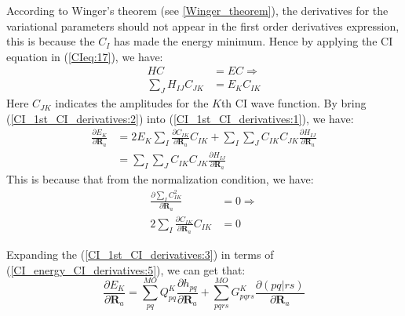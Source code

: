 According to Winger's theorem (see \ref{Winger_theorem}), the derivatives for
the variational parameters should not appear in the first order derivatives
expression, this is because the $C_{I}$ has made the energy minimum. Hence by
applying the CI equation in (\ref{CIeq:17}), we have:
\begin{align}
  \label{CI_1st_CI_derivatives:2}
HC &= EC \Longrightarrow \nonumber \\
\sum_{J}H_{IJ}C_{JK} &= E_{K}C_{IK} 
\end{align}
Here $C_{JK}$ indicates the amplitudes for the $K$th CI wave function. By bring
(\ref{CI_1st_CI_derivatives:2}) into (\ref{CI_1st_CI_derivatives:1}), we have:
\begin{align}
 \label{CI_1st_CI_derivatives:3}
\frac{\partial E_{K}}{ \partial \bm{R}_{a}} &= 2E_{K}\sum_{I}\frac{\partial
C_{IK}}{\partial \bm{R}_{a}}C_{IK} +
\sum_{I}\sum_{J}C_{IK}C_{JK}\frac{\partial H_{IJ} }{\partial \bm{R}_{a}}
\nonumber \\
&= \sum_{I}\sum_{J}C_{IK}C_{JK}\frac{\partial H_{IJ} }{\partial \bm{R}_{a}}
\end{align}
This is because that from the normalization condition, we have:
\begin{equation}
 \begin{split}
  \frac{\partial \sum_{I}C_{IK}^{2}}{\partial \bm{R}_{a}} &= 0 \Longrightarrow
\\
2\sum_{I}\frac{\partial
C_{IK}}{\partial \bm{R}_{a}}C_{IK} &= 0
 \end{split}
\label{CI_1st_CI_derivatives:4}
\end{equation}

Expanding the (\ref{CI_1st_CI_derivatives:3}) in terms of
(\ref{CI_energy_CI_derivatives:5}), we can get that:
\begin{equation}
\label{CI_1st_CI_derivatives:5}
 \frac{\partial E_{K}}{ \partial \bm{R}_{a}} =
\sum_{pq}^{MO}Q^{K}_{pq}\frac{\partial h_{pq}}{\partial \bm{R}_{a}} +
\sum_{pqrs}^{MO}G^{K}_{pqrs}\frac{\partial (pq|rs)}{\partial \bm{R}_{a}}
\end{equation}


